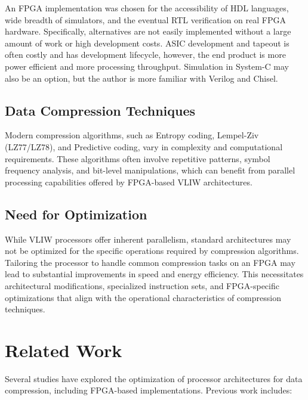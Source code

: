 \documentclass[sigconf]{acmart}
\begin{document}
	An FPGA implementation was chosen for the accessibility of HDL languages, wide breadth of simulators, and the eventual RTL verification on real FPGA hardware. Specifically, alternatives are not easily implemented without a large amount of work or high development costs. ASIC development and tapeout is often costly and has development lifecycle, however, the end product is more power efficient and more processing throughput. Simulation in System-C may also be an option, but the author is more familiar with Verilog and Chisel. 
	
	\subsection{Data Compression Techniques}
	Modern compression algorithms, such as Entropy coding, Lempel-Ziv (LZ77/LZ78), and Predictive coding, vary in complexity and computational requirements. These algorithms often involve repetitive patterns, symbol frequency analysis, and bit-level manipulations, which can benefit from parallel processing capabilities offered by FPGA-based VLIW architectures.
	
	\subsection{Need for Optimization}
	While VLIW processors offer inherent parallelism, standard architectures may not be optimized for the specific operations required by compression algorithms. Tailoring the processor to handle common compression tasks on an FPGA may lead to substantial improvements in speed and energy efficiency. This necessitates architectural modifications, specialized instruction sets, and FPGA-specific optimizations that align with the operational characteristics of compression techniques.
	
	\section{Related Work}
	Several studies have explored the optimization of processor architectures for data compression, including FPGA-based implementations. Previous work includes:
	
\end{document}
